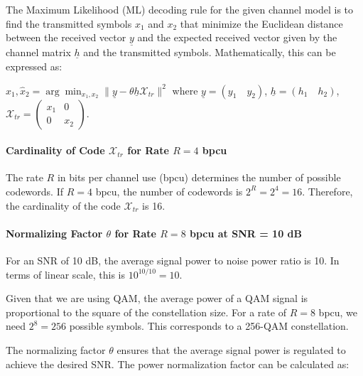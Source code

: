 \documentclass[11pt]{article}
\begin{document}
The Maximum Likelihood (ML) decoding rule for the given channel model is
to find the transmitted symbols \(x_1\) and \(x_2\) that minimize the
Euclidean distance between the received vector \(\underline{y}\) and the
expected received vector given by the channel matrix \(\underline{h}\)
and the transmitted symbols. Mathematically, this can be expressed as:

\(\hat{x}_1, \hat{x}_2 = \arg\min_{x_1, x_2} \| \underline{y} - \theta \underline{h} \mathcal{X}_{tr} \|^2\)
where \(\underline{y} = (y_1 \quad y_2)\),
\(\underline{h} = (h_1 \quad h_2)\),
\(\mathcal{X}_{tr} = \begin{pmatrix} x_1 & 0 \\ 0 & x_2 \end{pmatrix}\).

\paragraph{\texorpdfstring{Cardinality of Code \(\mathcal{X}_{tr}\) for
Rate \(R = 4\)
bpcu}{Cardinality of Code \textbackslash mathcal\{X\}\_\{tr\} for Rate R = 4 bpcu}}\label{cardinality-of-code-mathcalx_tr-for-rate-r-4-bpcu}

The rate \(R\) in bits per channel use (bpcu) determines the number of
possible codewords. If \(R = 4\) bpcu, the number of codewords is
\(2^R = 2^4 = 16\). Therefore, the cardinality of the code
\(\mathcal{X}_{tr}\) is 16.

\paragraph{\texorpdfstring{Normalizing Factor \(\theta\) for Rate
\(R = 8\) bpcu at SNR = 10
dB}{Normalizing Factor \textbackslash theta for Rate R = 8 bpcu at SNR = 10 dB}}\label{normalizing-factor-theta-for-rate-r-8-bpcu-at-snr-10-db}

For an SNR of 10 dB, the average signal power to noise power ratio is
10. In terms of linear scale, this is \(10^{10/10} = 10\).

Given that we are using QAM, the average power of a QAM signal is
proportional to the square of the constellation size. For a rate of
\(R = 8\) bpcu, we need \(2^8 = 256\) possible symbols. This corresponds
to a 256-QAM constellation.

The normalizing factor \(\theta\) ensures that the average signal power
is regulated to achieve the desired SNR. The power normalization factor
can be calculated as:
\end{document}

